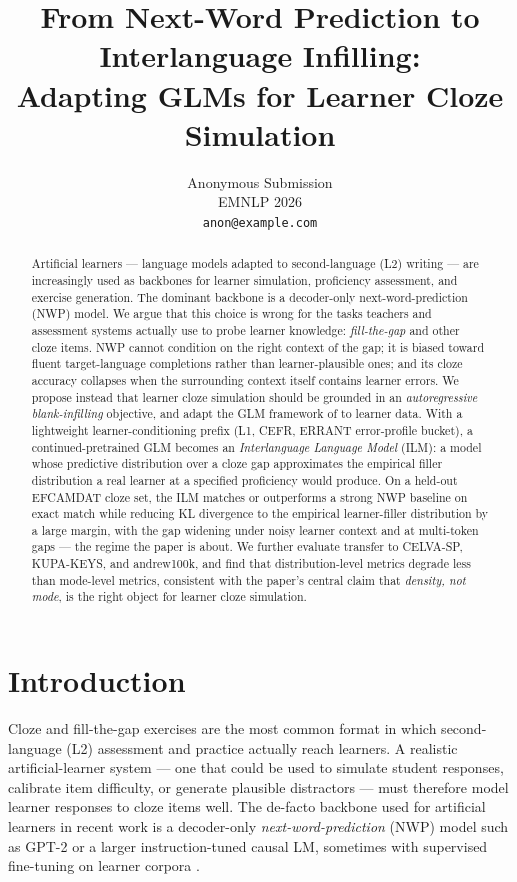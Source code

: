 \documentclass[11pt]{article}
\title{From Next-Word Prediction to Interlanguage Infilling:\\
Adapting GLMs for Learner Cloze Simulation}
\author{Anonymous Submission \\
        EMNLP 2026 \\
        \texttt{anon@example.com}}
\begin{document}
\maketitle

\begin{abstract}
Artificial learners --- language models adapted to second-language (L2)
writing --- are increasingly used as backbones for learner simulation,
proficiency assessment, and exercise generation. The dominant backbone is a
decoder-only next-word-prediction (NWP) model. We argue that this choice is
wrong for the tasks teachers and assessment systems actually use to probe
learner knowledge: \emph{fill-the-gap} and other cloze items. NWP cannot
condition on the right context of the gap; it is biased toward fluent
target-language completions rather than learner-plausible ones; and its
cloze accuracy collapses when the surrounding context itself contains
learner errors. We propose instead that learner cloze simulation should be
grounded in an \emph{autoregressive blank-infilling} objective, and adapt
the GLM framework of \citet{du2022glm} to learner data. With a lightweight
learner-conditioning prefix (L1, CEFR, ERRANT error-profile bucket), a
continued-pretrained GLM becomes an \emph{Interlanguage Language Model}
(ILM): a model whose predictive distribution over a cloze gap approximates
the empirical filler distribution a real learner at a specified proficiency
would produce. On a held-out EFCAMDAT cloze set, the ILM matches or
outperforms a strong NWP baseline on exact match while reducing KL divergence
to the empirical learner-filler distribution by a large margin, with the gap
widening under noisy learner context and at multi-token gaps --- the regime
the paper is about. We further evaluate transfer to CELVA-SP, KUPA-KEYS, and
andrew100k, and find that distribution-level metrics degrade less than
mode-level metrics, consistent with the paper's central claim that
\emph{density, not mode}, is the right object for learner cloze simulation.
\end{abstract}

\section{Introduction}
\label{sec:intro}

Cloze and fill-the-gap exercises are the most common format in which
second-language (L2) assessment and practice actually reach learners. A
realistic artificial-learner system --- one that could be used to simulate
student responses, calibrate item difficulty, or generate plausible
distractors --- must therefore model learner responses to cloze items well.
The de-facto backbone used for artificial learners in recent work is a
decoder-only \emph{next-word-prediction} (NWP) model such as GPT-2
\citep{radford2019language} or a larger instruction-tuned causal LM,
sometimes with supervised fine-tuning on learner corpora
\citep{caines2023application,naismith2023automated}.
\end{document}
